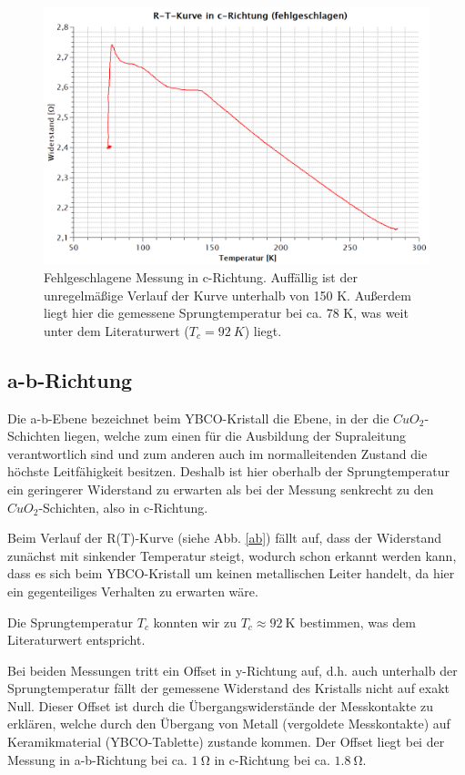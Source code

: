 \begin{figure}[H]
	\begin{center}
		\includegraphics[width=17cm]{fail.png}
		\caption{Fehlgeschlagene Messung in c-Richtung. Auffällig ist der unregelmäßige Verlauf der Kurve unterhalb von 150 K. Außerdem liegt hier die gemessene Sprungtemperatur bei ca. 78 K, was weit unter dem Literaturwert ($T_{c}=\SI{92}{K}$) liegt. }
		\label{fail}
	\end{center}
\end{figure}


\subsection{a-b-Richtung} %
Die a-b-Ebene bezeichnet beim YBCO-Kristall die Ebene, in der die $CuO_{2}$-Schichten liegen, welche zum einen für die Ausbildung der Supraleitung verantwortlich sind und zum anderen auch im normalleitenden Zustand die höchste Leitfähigkeit besitzen. Deshalb ist hier oberhalb der Sprungtemperatur ein geringerer Widerstand zu erwarten als bei der Messung senkrecht zu den $CuO_{2}$-Schichten, also in c-Richtung.

Beim Verlauf der R(T)-Kurve (siehe Abb. \ref{ab})  fällt auf, dass der Widerstand zunächst mit sinkender Temperatur steigt, wodurch schon erkannt werden kann, dass es sich beim YBCO-Kristall um keinen metallischen Leiter handelt, da hier ein gegenteiliges Verhalten zu erwarten wäre.

Die Sprungtemperatur $T_{c}$ konnten wir zu $T_{c}\approx\SI{92}{\kelvin}$ bestimmen, was dem Literaturwert entspricht. \cite{hunklinger}

Bei beiden Messungen tritt ein Offset in y-Richtung auf, d.h. auch unterhalb der Sprungtemperatur fällt der gemessene Widerstand des Kristalls nicht auf exakt Null. Dieser Offset ist durch die Übergangswiderstände der Messkontakte zu erklären, welche durch den Übergang von Metall (vergoldete Messkontakte) auf Keramikmaterial (YBCO-Tablette) zustande kommen. Der Offset liegt bei der Messung in a-b-Richtung bei ca. $\SI{1}{\ohm}$ in c-Richtung bei ca. $\SI{1,8}{\ohm}$.

